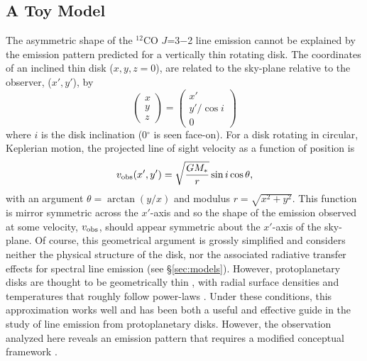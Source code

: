 \subsection{A Toy Model}\label{sec:toy}

The asymmetric shape of the $^{12}$CO $J$=3$-$2 line emission cannot be 
explained by the emission pattern predicted for a vertically thin rotating disk.
The coordinates of an inclined thin disk ($x,y,z=0$), are related to the 
sky-plane relative to the observer, ($x',y'$), by
\begin{equation}
\left(\begin{array}{c} x \\ y \\ z \end{array}\right) = \left(\begin{array}{c} x' \\ y' / \cos i \\ 0 \end{array}\right)
\end{equation}
where $i$ is the disk inclination (0$^\circ$ is seen face-on).  For a disk 
rotating in circular, Keplerian motion, the projected line of sight velocity as a
function of position is
\begin{equation}
v_{\rm obs}(x',y') = \sqrt{\frac{GM_\ast}{r}} \sin i \cos \theta,
\end{equation}
with an argument $\theta = \arctan(y/x)$ and modulus $r=\sqrt{x^2+y^2}$.  This 
function is mirror symmetric across the $x'$-axis and so the shape of the 
emission observed at some velocity, $v_{\rm obs}$, should appear symmetric about
the $x'$-axis of the sky-plane.  Of course, this geometrical argument is grossly
simplified and considers neither the physical structure of the disk, nor the 
associated radiative transfer effects for spectral line emission (see 
\S\ref{sec:models}).  However, protoplanetary disks are thought to be 
geometrically thin \citep{pringle81}, with radial surface densities and 
temperatures that roughly follow power-laws \citep[i.e. slowly changing $\rho$ 
and $T$ in the outer disk;][]{weidenschilling77a,adams88}.  Under these 
conditions, this approximation works well and has been both a useful and 
effective guide in the study of line emission from protoplanetary disks.  
However, the observation analyzed here reveals an emission pattern that requires
a modified conceptual framework \citep[see also][]{pavlyuchenkov07,semenov08,
guilloteau12}.

